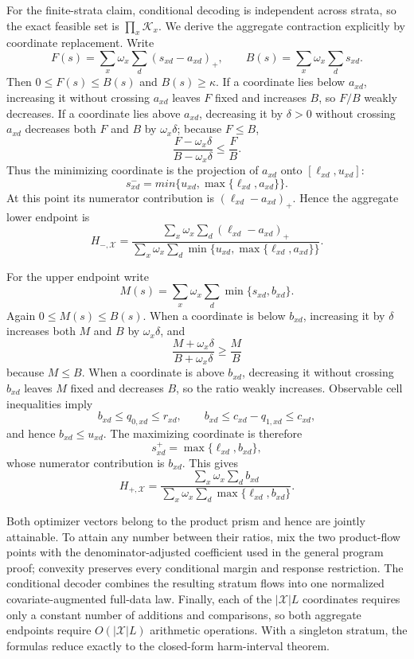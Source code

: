 For the finite-strata claim, conditional decoding is independent across strata, so the exact feasible set is \(\prod_x\mathcal K_x\).  We derive the aggregate contraction explicitly by coordinate replacement.  Write
\[
 F(s)=\sum_x\omega_x\sum_d(s_{xd}-a_{xd})_+,
 \qquad
 B(s)=\sum_x\omega_x\sum_ds_{xd}.
\]
Then \(0\le F(s)\le B(s)\) and \(B(s)\ge\kappa\).  If a coordinate lies below \(a_{xd}\), increasing it without crossing \(a_{xd}\) leaves \(F\) fixed and increases \(B\), so \(F/B\) weakly decreases.  If a coordinate lies above \(a_{xd}\), decreasing it by \(\delta>0\) without crossing \(a_{xd}\) decreases both \(F\) and \(B\) by \(\omega_x\delta\); because \(F\le B\),
\[
 \frac{F-\omega_x\delta}{B-\omega_x\delta}
 \le\frac FB.
\]
Thus the minimizing coordinate is the projection of \(a_{xd}\) onto \([\ell_{xd},u_{xd}]\):
\[
 s_{xd}^-=min\{u_{xd},\max\{\ell_{xd},a_{xd}\}\}.
\]
At this point its numerator contribution is \((\ell_{xd}-a_{xd})_+\).  Hence the aggregate lower endpoint is
\[
 H_{-,\mathcal X}=
 \frac{\sum_x\omega_x\sum_d(\ell_{xd}-a_{xd})_+}
 {\sum_x\omega_x\sum_d
 \min\{u_{xd},\max\{\ell_{xd},a_{xd}\}\}}.
\]

For the upper endpoint write
\[
 M(s)=\sum_x\omega_x\sum_d\min\{s_{xd},b_{xd}\}.
\]
Again \(0\le M(s)\le B(s)\).  When a coordinate is below \(b_{xd}\), increasing it by \(\delta\) increases both \(M\) and \(B\) by \(\omega_x\delta\), and
\[
 \frac{M+\omega_x\delta}{B+\omega_x\delta}
 \ge\frac MB
\]
because \(M\le B\).  When a coordinate is above \(b_{xd}\), decreasing it without crossing \(b_{xd}\) leaves \(M\) fixed and decreases \(B\), so the ratio weakly increases.  Observable cell inequalities imply
\[
 b_{xd}\le q_{0,xd}\le r_{xd},
 \qquad
 b_{xd}\le c_{xd}-q_{1,xd}\le c_{xd},
\]
and hence \(b_{xd}\le u_{xd}\).  The maximizing coordinate is therefore
\[
 s_{xd}^+=\max\{\ell_{xd},b_{xd}\},
\]
whose numerator contribution is \(b_{xd}\).  This gives
\[
 H_{+,\mathcal X}=
 \frac{\sum_x\omega_x\sum_db_{xd}}
 {\sum_x\omega_x\sum_d\max\{\ell_{xd},b_{xd}\}}.
\]

Both optimizer vectors belong to the product prism and hence are jointly attainable.  To attain any number between their ratios, mix the two product-flow points with the denominator-adjusted coefficient used in the general program proof; convexity preserves every conditional margin and response restriction.  The conditional decoder combines the resulting stratum flows into one normalized covariate-augmented full-data law.  Finally, each of the \(|\mathcal X|L\) coordinates requires only a constant number of additions and comparisons, so both aggregate endpoints require \(O(|\mathcal X|L)\) arithmetic operations.  With a singleton stratum, the formulas reduce exactly to the closed-form harm-interval theorem.
